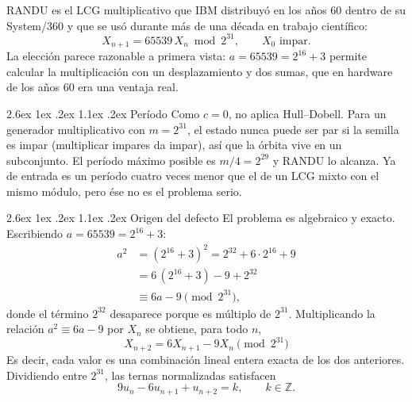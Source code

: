 \documentclass[11pt,letterpaper]{article}
\makeatletter
\renewcommand\paragraph{\@startsection{paragraph}{4}{\z@}%
  {2.6ex \@plus 1ex \@minus .2ex}%
  {1.1ex \@plus .2ex}%
  {\normalfont\normalsize\bfseries}}
\makeatother
\begin{document}
RANDU es el LCG multiplicativo que IBM distribuyó en los años 60 dentro de su
System/360 y que se usó durante más de una década en trabajo científico:
\begin{equation}
X_{n+1} = 65539\, X_n \bmod 2^{31},
\qquad X_0 \text{ impar}.
\label{eq:randudef}
\end{equation}
La elección parece razonable a primera vista: $a = 65539 = 2^{16}+3$ permite
calcular la multiplicación con un desplazamiento y dos sumas, que en hardware
de los años 60 era una ventaja real.

\paragraph{Período} Como $c = 0$, no aplica Hull--Dobell. Para un generador
multiplicativo con $m = 2^{31}$, el estado nunca puede ser par si la semilla
es impar (multiplicar impares da impar), así que la órbita vive en un
subconjunto. El período máximo posible es $m/4 = 2^{29}$ y RANDU lo alcanza.
Ya de entrada es un período cuatro veces menor que el de un LCG mixto con el
mismo módulo, pero ése no es el problema serio.

\paragraph{Origen del defecto} El problema es algebraico y exacto. Escribiendo
$a = 65539 = 2^{16}+3$:
\begin{align}
a^2 &= (2^{16}+3)^2 = 2^{32} + 6\cdot 2^{16} + 9 \nonumber\\
    &= 6\,(2^{16}+3) - 9 + 2^{32} \nonumber\\
    &\equiv 6a - 9 \pmod{2^{31}},
\end{align}
donde el término $2^{32}$ desaparece porque es múltiplo de $2^{31}$.
Multiplicando la relación $a^2 \equiv 6a - 9$ por $X_n$ se obtiene, para todo
$n$,
\begin{equation}
\boxed{\,X_{n+2} = 6 X_{n+1} - 9 X_n \pmod{2^{31}}\,}
\label{eq:randu}
\end{equation}
Es decir, cada valor es una combinación lineal entera exacta de los dos
anteriores. Dividiendo entre $2^{31}$, las ternas normalizadas satisfacen
\begin{equation}
9 u_n - 6 u_{n+1} + u_{n+2} = k, \qquad k \in \mathbb{Z}.
\label{eq:randuplanos}
\end{equation}
\end{document}

